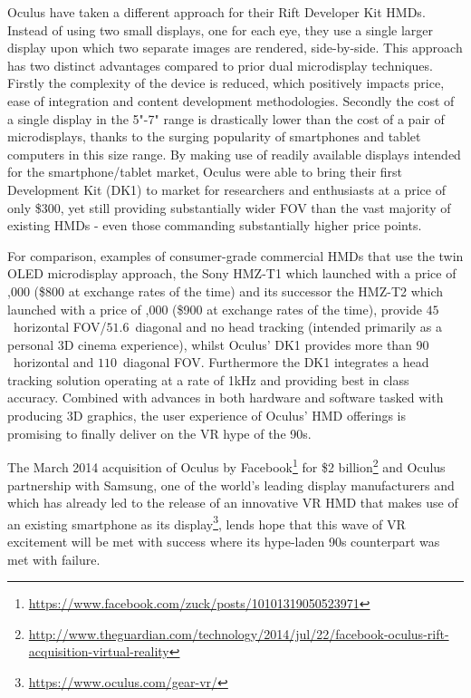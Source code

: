 Oculus have taken a different approach for their Rift Developer Kit HMDs. Instead of using two small displays, one for each eye, they use a single larger display upon which two separate images are rendered, side-by-side. This approach has two distinct advantages compared to prior dual microdisplay techniques. Firstly the complexity of the device is reduced, which positively impacts price, ease of integration and content development methodologies. Secondly the cost of a single display in the 5"-7" range is drastically lower than the cost of a pair of microdisplays, thanks to the surging popularity of smartphones and tablet computers in this size range. By making use of readily available displays intended for the smartphone/tablet market, Oculus were able to bring their first Development Kit (DK1) to market for researchers and enthusiasts at a price of only \$300, yet still providing substantially wider FOV than the vast majority of existing HMDs - even those commanding substantially higher price points.

For comparison, examples of consumer-grade commercial HMDs that use the twin OLED microdisplay approach, the Sony HMZ-T1 which launched with a price of ,000 (\$800 at exchange rates of the time) and its successor the HMZ-T2 which launched with a price of ,000 (\$900 at exchange rates of the time), provide $45$\textdegree\ horizontal FOV/$51.6$\textdegree\ diagonal and no head tracking (intended primarily as a personal 3D cinema experience), whilst Oculus' DK1 provides more than $90$\textdegree\ horizontal and $110$\textdegree\ diagonal FOV. Furthermore the DK1 integrates a head tracking solution operating at a rate of 1kHz and providing best in class accuracy. Combined with advances in both hardware and software tasked with producing 3D graphics, the user experience of Oculus' HMD offerings is promising to finally deliver on the VR hype of the 90s.

The March 2014 acquisition of Oculus by Facebook\footnote{\url{https://www.facebook.com/zuck/posts/10101319050523971}} for \$2 billion\footnote{\url{http://www.theguardian.com/technology/2014/jul/22/facebook-oculus-rift-acquisition-virtual-reality}} and Oculus partnership with Samsung, one of the world's leading display manufacturers and which has already led to the release of an innovative VR HMD that makes use of an existing smartphone as its display\footnote{\url{https://www.oculus.com/gear-vr/}}, lends hope that this wave of VR excitement will be met with success where its hype-laden 90s counterpart was met with failure.

